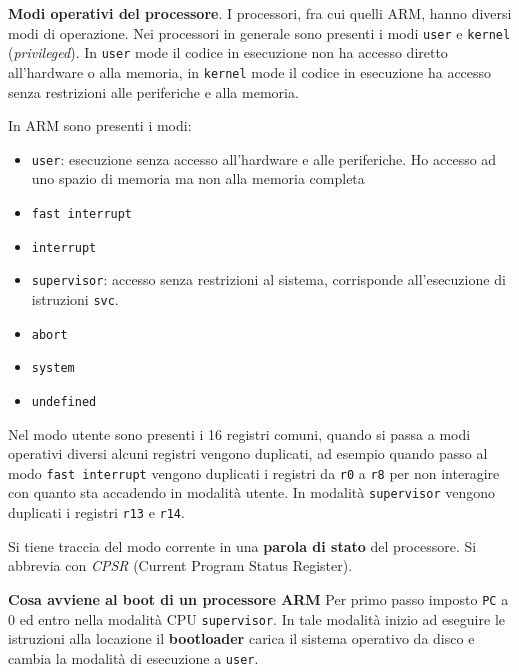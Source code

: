 \begin{defn}
    \textbf{Modi operativi del processore}.
    I processori, fra cui quelli ARM, hanno diversi modi di operazione. Nei processori in generale
    sono presenti i modi \verb|user| e \verb|kernel| (\textit{privileged}). In \verb|user| mode
    il codice in esecuzione non ha accesso diretto all'hardware o alla memoria, in \verb|kernel| mode
    il codice in esecuzione ha accesso senza restrizioni alle periferiche e alla memoria.

    In ARM sono presenti i modi:
    \begin{itemize}
        \item \verb|user|: esecuzione senza accesso all'hardware e alle periferiche.
        Ho accesso ad uno spazio di memoria ma non alla memoria completa
        \item \verb|fast interrupt|
        \item \verb|interrupt|
        \item \verb|supervisor|: accesso senza restrizioni al sistema, corrisponde all'esecuzione
        di istruzioni \verb|svc|.
        \item \verb|abort|
        \item \verb|system|
        \item \verb|undefined|
    \end{itemize}

    Nel modo utente sono presenti i 16 registri comuni, quando si passa a modi operativi diversi
    alcuni registri vengono duplicati, ad esempio quando passo al modo \verb|fast interrupt| vengono duplicati
    i registri da \verb|r0| a \verb|r8| per non interagire con quanto sta accadendo in modalità utente.
    In modalità \verb|supervisor| vengono duplicati i registri \verb|r13| e \verb|r14|.

    Si tiene traccia del modo corrente in una \textbf{parola di stato} del processore.
    Si abbrevia con \textit{CPSR} (Current Program Status Register).

\end{defn}


\begin{defn}
    \textbf{Cosa avviene al boot di un processore ARM}
    Per primo passo imposto \verb|PC| a 0 ed entro nella modalità CPU \verb|supervisor|.
    In tale modalità inizio ad eseguire le istruzioni alla locazione il \textbf{bootloader} carica il
    sistema operativo da disco e cambia la modalità di esecuzione a \verb|user|.
\end{defn}

